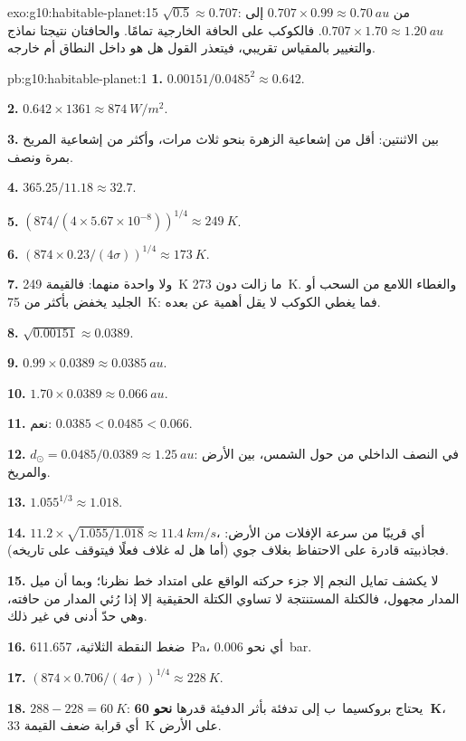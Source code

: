 \begin{solution}{exo:g10:habitable-planet:15}
$\sqrt{0.5} \approx 0.707$: من $0.707 \times 0.99 \approx \qty{0.70}{au}$
إلى $0.707 \times 1.70 \approx \qty{1.20}{au}$. فالكوكب على الحافة الخارجية
تمامًا. والحافتان نتيجتا نماذج والتغيير بالمقياس تقريبي، فيتعذر القول هل هو
داخل النطاق أم خارجه.
\end{solution}

\begin{solution}{pb:g10:habitable-planet:1}
\textbf{1.} $0.00151/0.0485^2 \approx 0.642$.

\textbf{2.} $0.642 \times 1361 \approx \qty{874}{W/m^2}$.

\textbf{3.} بين الاثنتين: أقل من إشعاعية الزهرة بنحو ثلاث مرات، وأكثر من إشعاعية
المريخ بمرة ونصف.

\textbf{4.} $365.25/11.18 \approx 32.7$.

\textbf{5.} $(874/(4 \times 5.67\times10^{-8}))^{1/4} \approx \qty{249}{K}$.

\textbf{6.} $(874 \times 0.23/(4\sigma))^{1/4} \approx \qty{173}{K}$.

\textbf{7.} ولا واحدة منهما: فالقيمة \qty{249}{K} ما زالت دون \qty{273}{K}. والغطاء
اللامع من السحب أو الجليد يخفض  بأكثر من
\qty{75}{K}: فما يغطي الكوكب لا يقل أهمية عن بعده.

\textbf{8.} $\sqrt{0.00151} \approx 0.0389$.

\textbf{9.} $0.99 \times 0.0389 \approx \qty{0.0385}{au}$.

\textbf{10.} $1.70 \times 0.0389 \approx \qty{0.066}{au}$.

\textbf{11.} نعم: $0.0385 < 0.0485 < 0.066$.

\textbf{12.} $d_\odot = 0.0485/0.0389 \approx \qty{1.25}{au}$: في النصف
الداخلي من  حول الشمس، بين الأرض والمريخ.

\textbf{13.} $1.055^{1/3} \approx 1.018$.

\textbf{14.} $11.2 \times \sqrt{1.055/1.018} \approx \qty{11.4}{km/s}$، أي قريبًا
من سرعة الإفلات من الأرض: فجاذبيته قادرة على الاحتفاظ بغلاف جوي (أما هل له غلاف
فعلًا فيتوقف على تاريخه).

\textbf{15.} لا يكشف تمايل النجم إلا جزء حركته الواقع على امتداد خط نظرنا؛ وبما
أن ميل المدار مجهول، فالكتلة المستنتجة لا تساوي الكتلة الحقيقية إلا إذا رُئي
المدار من حافته، وهي حدّ أدنى في غير ذلك.

\textbf{16.} ضغط النقطة الثلاثية، \qty{611.657}{Pa}، أي نحو
\qty{0.006}{bar}.

\textbf{17.} $(874 \times 0.706/(4\sigma))^{1/4} \approx \qty{228}{K}$.

\textbf{18.} $288 - 228 = \qty{60}{K}$: يحتاج بروكسيما~ب إلى تدفئة بأثر الدفيئة
قدرها \textbf{نحو \qty{60}{K}}، أي قرابة ضعف القيمة \qty{33}{K} على الأرض.
\end{solution}
